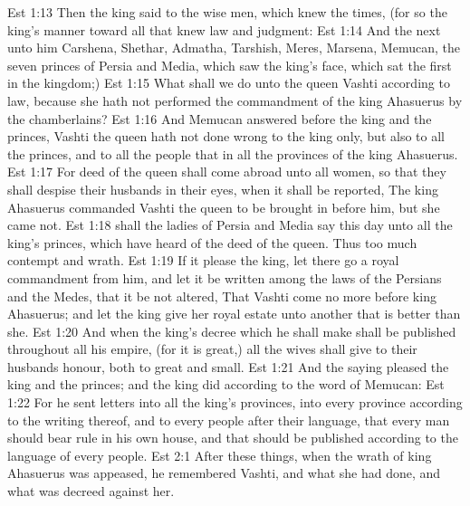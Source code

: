 \vs Est 1:13 Then the king said to the wise men, which knew the times, (for so  the king's manner toward all that knew law and judgment:
\vs Est 1:14 And the next unto him  Carshena, Shethar, Admatha, Tarshish, Meres, Marsena,  Memucan, the seven princes of Persia and Media, which saw the king's face,  which sat the first in the kingdom;)
\vs Est 1:15 What shall we do unto the queen Vashti according to law, because she hath not performed the commandment of the king Ahasuerus by the chamberlains?
\vs Est 1:16 And Memucan answered before the king and the princes, Vashti the queen hath not done wrong to the king only, but also to all the princes, and to all the people that  in all the provinces of the king Ahasuerus.
\vs Est 1:17 For  deed of the queen shall come abroad unto all women, so that they shall despise their husbands in their eyes, when it shall be reported, The king Ahasuerus commanded Vashti the queen to be brought in before him, but she came not.
\vs Est 1:18  shall the ladies of Persia and Media say this day unto all the king's princes, which have heard of the deed of the queen. Thus  too much contempt and wrath.
\vs Est 1:19 If it please the king, let there go a royal commandment from him, and let it be written among the laws of the Persians and the Medes, that it be not altered, That Vashti come no more before king Ahasuerus; and let the king give her royal estate unto another that is better than she.
\vs Est 1:20 And when the king's decree which he shall make shall be published throughout all his empire, (for it is great,) all the wives shall give to their husbands honour, both to great and small.
\vs Est 1:21 And the saying pleased the king and the princes; and the king did according to the word of Memucan:
\vs Est 1:22 For he sent letters into all the king's provinces, into every province according to the writing thereof, and to every people after their language, that every man should bear rule in his own house, and that  should be published according to the language of every people.
\vs Est 2:1 After these things, when the wrath of king Ahasuerus was ap\-pea\-sed, he remembered Vashti, and what she had done, and what was decreed against her.
